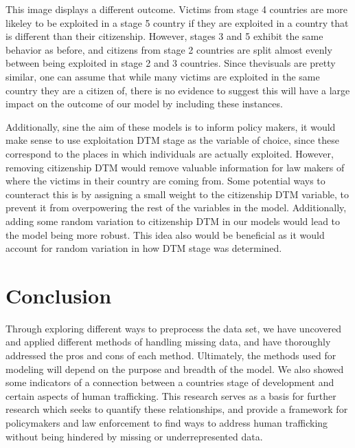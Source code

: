 \documentclass{article} %
\begin{document}
This image displays a different outcome. Victims from stage 4 countries are more likeley to be exploited in a stage 5 country if they are exploited in a country that is different than their citizenship. However, stages 3 and 5 exhibit the same behavior as before, and citizens from stage 2 countries are split almost evenly between being exploited in stage 2 and 3 countries. Since thevisuals are pretty similar, one can assume that while many victims are exploited in the same country they are a citizen of, there is no evidence to suggest this will have a large impact on the outcome of our model by including these instances. 

Additionally, sine the aim of these models is to inform policy makers, it would make sense to use exploitation DTM stage as the variable of choice, since these correspond to the places in which individuals are actually exploited. However, removing citizenship DTM would remove valuable information for law makers of where the victims in their country are coming from. 
Some potential ways to counteract this is by assigning a small weight to the citizenship DTM variable, to prevent it from overpowering the rest of the variables in the model. Additionally, adding some random variation to citizenship DTM in our models would lead to the model being more robust. This idea also would be beneficial as it would account for random variation in how DTM stage was determined. 





\section{Conclusion}

Through exploring different ways to preprocess the data set, we have uncovered and applied different methods of handling missing data, and have thoroughly addressed the pros and cons of each method. Ultimately, the methods used for modeling will depend on the purpose and breadth of the model. We also showed some indicators of a connection between a countries stage of development and certain aspects of human trafficking. This research serves as a basis for further research which seeks to quantify these relationships, and provide a framework for policymakers and law enforcement to find ways to address human trafficking without being hindered by missing or underrepresented data.
\newpage
\printbibliography
\end{document}
